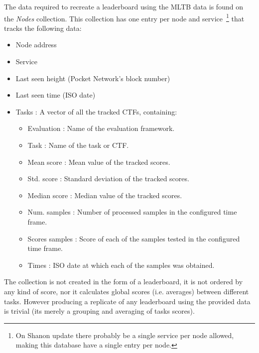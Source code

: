 The data required to recreate a leaderboard using the \gls{MLTB} data is found on the \emph{Nodes} collection. This collection has one entry per node and service~\footnote{On Shanon update there probably be a single service per node allowed, making this database have a single entry per node.} that tracks the following data:
\begin{itemize}
    \item Node address
    \item Service
    \item Last seen height (Pocket Network's block number)
    \item Last seen time (ISO date)
    \item Tasks : A vector of all the tracked \glspl{CTF}, containing:
    \begin{itemize}
        \item Evaluation : Name of the evaluation framework.
        \item Task : Name of the task or \gls{CTF}.
        \item Mean score : Mean value of the tracked scores.
        \item Std. score : Standard deviation of the tracked scores.
        \item Median score : Median value of the tracked scores.
        \item Num. samples : Number of processed samples in the configured time frame.
        \item Scores samples : Score of each of the samples tested in the configured time frame.
        \item Times : ISO date at which each of the samples was obtained.
    \end{itemize}
\end{itemize}

The collection is not created in the form of a leaderboard, it is not ordered by any kind of score, nor it calculates global scores (i.e. averages) between different tasks. However producing a replicate of any leaderboard using the provided data is trivial (its merely a grouping and averaging of tasks scores).

